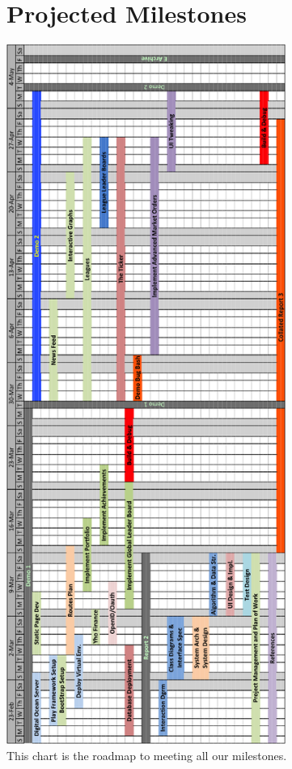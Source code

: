 \hfil\eject \pdfpagewidth=8.5in \pdfpageheight=11in
\begin{figure}
\section{Projected Milestones}
\centering
\includegraphics[height=9in]{./img/planOfWork.png}
\caption{This chart is the roadmap to meeting all our milestones.}
\end{figure}
